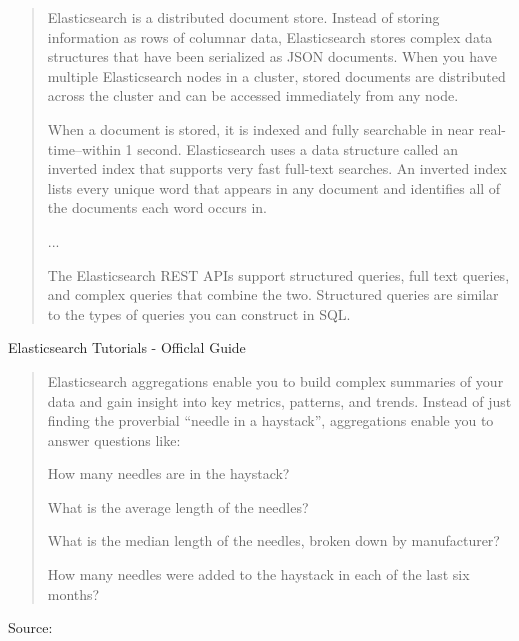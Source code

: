 \documentclass[Screen16to9,17pt]{foils}
\begin{document}


\begin{quote}
Elasticsearch is a distributed document store. Instead of storing information as rows of columnar data, Elasticsearch stores complex data structures that have been serialized as JSON documents. When you have multiple Elasticsearch nodes in a cluster, stored documents are distributed across the cluster and can be accessed immediately from any node.

When a document is stored, it is indexed and fully searchable in near real-time--within 1 second. Elasticsearch uses a data structure called an inverted index that supports very fast full-text searches. An inverted index lists every unique word that appears in any document and identifies all of the documents each word occurs in.

...

The Elasticsearch REST APIs support structured queries, full text queries, and complex queries that combine the two. Structured queries are similar to the types of queries you can construct in SQL. \end{quote}

\begin{list2}
\item {}
\item Elasticsearch Tutorials - Officlal Guide 
\end{list2}




\begin{quote}
Elasticsearch aggregations enable you to build complex summaries of your data and gain insight into key metrics, patterns, and trends. Instead of just finding the proverbial “needle in a haystack”, aggregations enable you to answer questions like:

\begin{list2}
\item How many needles are in the haystack?
\item What is the average length of the needles?
\item What is the median length of the needles, broken down by manufacturer?
\item How many needles were added to the haystack in each of the last six months?
\end{list2}
\end{quote}
Source: 
\end{document}

